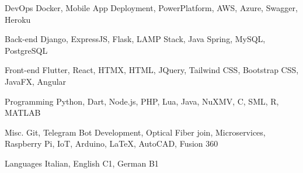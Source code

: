 

\begin{cvskills}

  \cvskill
    {DevOps} %
    {Docker, Mobile App Deployment, PowerPlatform, AWS, Azure, Swagger, Heroku} %

  \cvskill
    {Back-end} %
    {Django, ExpressJS, Flask, LAMP Stack, Java Spring, MySQL, PostgreSQL} %

  \cvskill
    {Front-end} %
    {Flutter, React, HTMX, HTML, JQuery, Tailwind CSS, Bootstrap CSS, JavaFX, Angular} %

  \cvskill
    {Programming} %
    {Python, Dart, Node.js, PHP, Lua, Java, NuXMV, C, SML, R, MATLAB} %

  \cvskill
  {Misc.} %
  {Git, Telegram Bot Development, Optical Fiber join, Microservices, Raspberry Pi, IoT, Arduino, LaTeX, AutoCAD, Fusion 360} %

  \cvskill
    {Languages} %
    {Italian, English C1, German B1} %

\end{cvskills}
